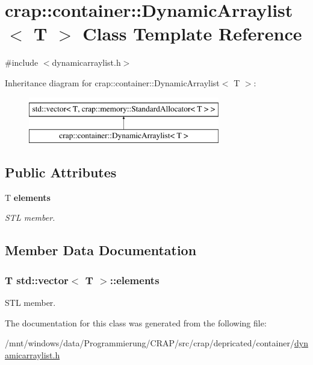 \hypertarget{classcrap_1_1container_1_1_dynamic_arraylist}{\section{crap\-:\-:container\-:\-:Dynamic\-Arraylist$<$ T $>$ Class Template Reference}
\label{classcrap_1_1container_1_1_dynamic_arraylist}
}


{\ttfamily \#include $<$dynamicarraylist.\-h$>$}

Inheritance diagram for crap\-:\-:container\-:\-:Dynamic\-Arraylist$<$ T $>$\-:\begin{figure}[H]
\begin{center}
\leavevmode
\includegraphics[height=2.000000cm]{classcrap_1_1container_1_1_dynamic_arraylist}
\end{center}
\end{figure}
\subsection*{Public Attributes}
\begin{DoxyCompactItemize}
\item 
T {\bfseries elements}
\begin{DoxyCompactList}\small\item\em S\-T\-L member. \end{DoxyCompactList}\end{DoxyCompactItemize}


\subsection{Member Data Documentation}
\hypertarget{classstd_1_1vector_a2396209900e8f592db1f0b2467f7d899}{
\subsubsection[{elements}]{\setlength{\rightskip}{0pt plus 5cm}T std\-::vector$<$ T $>$\-::elements\hspace{0.3cm}{\ttfamily [inherited]}}}\label{classstd_1_1vector_a2396209900e8f592db1f0b2467f7d899}


S\-T\-L member. 



The documentation for this class was generated from the following file\-:\begin{DoxyCompactItemize}
\item 
/mnt/windows/data/\-Programmierung/\-C\-R\-A\-P/src/crap/depricated/container/\hyperlink{dynamicarraylist_8h}{dynamicarraylist.\-h}\end{DoxyCompactItemize}
